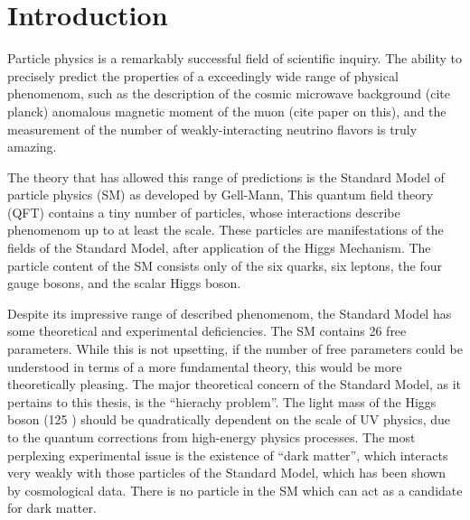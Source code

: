 
\chapter{Introduction}


Particle physics is a remarkably successful field of scientific inquiry.
The ability to precisely predict the properties of a exceedingly wide range of physical phenomenom, such as the description of the cosmic microwave background (cite planck)  anomalous magnetic moment of the muon (cite paper on this), and the measurement of the number of weakly-interacting neutrino flavors is truly amazing.

The theory that has allowed this range of predictions is the Standard Model of particle physics (SM) as developed by Gell-Mann, 
This quantum field theory (QFT) contains a tiny number of particles, whose interactions describe phenomenom up to at least the \TeV\xspace scale.
These particles are manifestations of the fields of the Standard Model, after application of the Higgs Mechanism.
The particle content of the SM consists only of the six quarks, six leptons, the four gauge bosons, and the scalar Higgs boson.

Despite its impressive range of described phenomenom, the Standard Model has some theoretical and experimental deficiencies.
The SM contains 26 free parameters. \footnotemark 
While this is not upsetting, if the number of free parameters could be understood in terms of a more fundamental theory, this would be more theoretically pleasing.
The major theoretical concern of the Standard Model, as it pertains to this thesis, is the ``hierachy problem''.
The light mass of the Higgs boson (125 \GeV) should be quadratically dependent on the scale of UV physics, due to the quantum corrections from high-energy physics processes.
The most perplexing experimental issue is the existence of ``dark matter'', which interacts very weakly with those particles of the Standard Model,  which has been shown by cosmological data. 
There is no particle in the SM which can act as a candidate for dark matter.


